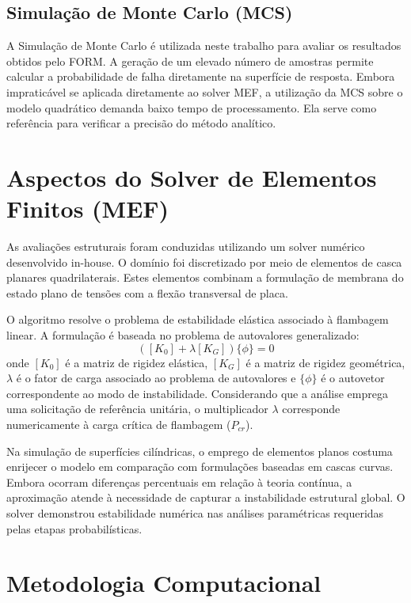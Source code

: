 \documentclass[12pt,a4paper]{article}
\begin{document}
\subsection{Simulação de Monte Carlo (MCS)}
A Simulação de Monte Carlo é utilizada neste trabalho para avaliar os resultados obtidos pelo FORM. A geração de um elevado número de amostras permite calcular a probabilidade de falha diretamente na superfície de resposta. Embora impraticável se aplicada diretamente ao solver MEF, a utilização da MCS sobre o modelo quadrático demanda baixo tempo de processamento. Ela serve como referência para verificar a precisão do método analítico.

\section{Aspectos do Solver de Elementos Finitos (MEF)}
As avaliações estruturais foram conduzidas utilizando um solver numérico desenvolvido in-house. O domínio foi discretizado por meio de elementos de casca planares quadrilaterais. Estes elementos combinam a formulação de membrana do estado plano de tensões com a flexão transversal de placa.

O algoritmo resolve o problema de estabilidade elástica associado à flambagem linear. A formulação é baseada no problema de autovalores generalizado:
\begin{equation}
    ( [K_0] + \lambda [K_G] ) \{\phi\} = 0
\end{equation}
onde $[K_0]$ é a matriz de rigidez elástica, $[K_G]$ é a matriz de rigidez geométrica, $\lambda$ é o fator de carga associado ao problema de autovalores e $\{\phi\}$ é o autovetor correspondente ao modo de instabilidade. Considerando que a análise emprega uma solicitação de referência unitária, o multiplicador $\lambda$ corresponde numericamente à carga crítica de flambagem ($P_{cr}$).

Na simulação de superfícies cilíndricas, o emprego de elementos planos costuma enrijecer o modelo em comparação com formulações baseadas em cascas curvas. Embora ocorram diferenças percentuais em relação à teoria contínua, a aproximação atende à necessidade de capturar a instabilidade estrutural global. O solver demonstrou estabilidade numérica nas análises paramétricas requeridas pelas etapas probabilísticas.

\section{Metodologia Computacional}
\end{document}
